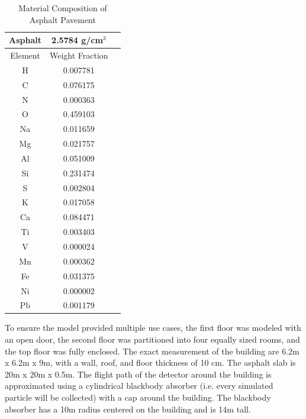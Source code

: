 \begin{table}[!htp]
 \caption{Material Composition of Asphalt Pavement}
  \begin{center}
    \begin{tabulary}{\columnwidth}{ccc}
      \hline
      Asphalt & 2.5784 g/cm$^{3}$\\ \hline
      Element & Weight Fraction\\ \hline
      H & 0.007781\\
      C & 0.076175\\
      N & 0.000363\\
      O & 0.459103\\
      Na & 0.011659\\
      Mg & 0.021757\\
      Al & 0.051009\\
      Si & 0.231474\\
      S & 0.002804\\
      K & 0.017058\\
      Ca & 0.084471\\
      Ti & 0.003403\\
      V & 0.000024\\
      Mn & 0.000362\\
      Fe & 0.031375\\
      Ni & 0.000002\\
      Pb & 0.001179\\ \hline
    \end{tabulary}
  \end{center}
  \label{table:asphalt}
\end{table}

To ensure the model provided multiple use cases, the first floor was modeled with an open door, the second floor was partitioned into four equally sized rooms, and the top floor was fully enclosed. The exact measurement of the building are 6.2m x 6.2m x 9m, with a wall, roof, and floor thickness of 10 cm. The asphalt slab is 20m x 20m x 0.5m. The flight path of the detector around the building is approximated using a cylindrical blackbody absorber (i.e. every simulated particle will be collected) with a cap around the building. The blackbody absorber has a 10m radius centered on the building and is 14m tall.

